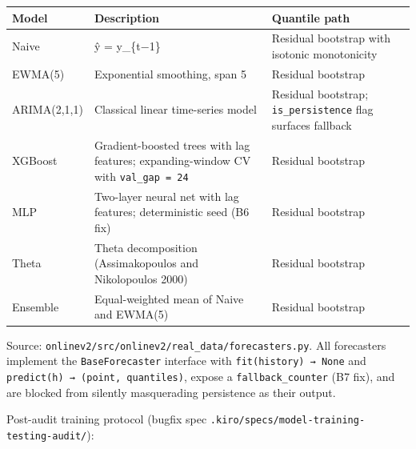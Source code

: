 \documentclass[11pt,a4paper,openany]{report}
\begin{document}
\begin{center}
\small
\begin{tabular}{lll}
\toprule
\textbf{Model} & \textbf{Description} & \textbf{Quantile path} \\
\midrule
Naive & ŷ = y\_\{t−1\} & Residual bootstrap with isotonic monotonicity \\
EWMA(5) & Exponential smoothing, span 5 & Residual bootstrap \\
ARIMA(2,1,1) & Classical linear time-series model & Residual bootstrap; \texttt{is\_persistence} flag surfaces fallback \\
XGBoost & Gradient-boosted trees with lag features; expanding-window CV with \texttt{val\_gap = 24} & Residual bootstrap \\
MLP & Two-layer neural net with lag features; deterministic seed (B6 fix) & Residual bootstrap \\
Theta & Theta decomposition (Assimakopoulos and Nikolopoulos 2000) & Residual bootstrap \\
Ensemble & Equal-weighted mean of Naive and EWMA(5) & Residual bootstrap \\
\bottomrule
\end{tabular}
\end{center}

Source: \texttt{onlinev2/src/onlinev2/real\_data/forecasters.py}. All
forecasters implement the \texttt{BaseForecaster} interface with
\texttt{fit(history) → None} and \texttt{predict(h) → (point, quantiles)}, expose a
\texttt{fallback\_counter} (B7 fix), and are blocked from silently masquerading
persistence as their output.

Post-audit training protocol (bugfix spec
\texttt{.kiro/specs/model-training-testing-audit/}):
\end{document}
